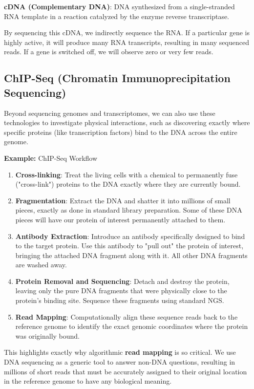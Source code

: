 \begin{important}
  \textbf{cDNA (Complementary DNA)}: DNA synthesized from a single-stranded RNA template in a reaction catalyzed by the enzyme reverse transcriptase. 
\end{important}

By sequencing this cDNA, we indirectly sequence the RNA. If a particular gene is highly active, it will produce many RNA transcripts, resulting in many sequenced reads. If a gene is switched off, we will observe zero or very few reads.

\subsection{ChIP-Seq (Chromatin Immunoprecipitation Sequencing)}
Beyond sequencing genomes and transcriptomes, we can also use these technologies to investigate physical interactions, such as discovering exactly where specific proteins (like transcription factors) bind to the DNA across the entire genome.

\textbf{Example:} ChIP-Seq Workflow
\begin{enumerate}
  \item \textbf{Cross-linking}: Treat the living cells with a chemical to permanently fuse ("cross-link") proteins to the DNA exactly where they are currently bound.
  \item \textbf{Fragmentation}: Extract the DNA and shatter it into millions of small pieces, exactly as done in standard library preparation. Some of these DNA pieces will have our protein of interest permanently attached to them.
  \item \textbf{Antibody Extraction}: Introduce an antibody specifically designed to bind to the target protein. Use this antibody to "pull out" the protein of interest, bringing the attached DNA fragment along with it. All other DNA fragments are washed away.
  \item \textbf{Protein Removal and Sequencing}: Detach and destroy the protein, leaving only the pure DNA fragments that were physically close to the protein's binding site. Sequence these fragments using standard NGS.
  \item \textbf{Read Mapping}: Computationally align these sequence reads back to the reference genome to identify the exact genomic coordinates where the protein was originally bound.
\end{enumerate}

\sta This highlights exactly why algorithmic \textbf{read mapping} is so critical. We use DNA sequencing as a generic tool to answer non-DNA questions, resulting in millions of short reads that must be accurately assigned to their original location in the reference genome to have any biological meaning.

